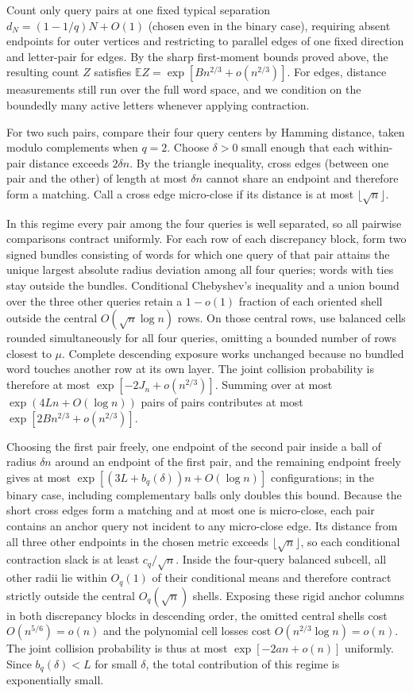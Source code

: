 Count only query pairs at one fixed typical separation $d_N=(1-1/q)N+O(1)$ (chosen even in the binary case), requiring absent endpoints for outer vertices and restricting to parallel edges of one fixed direction and letter-pair for edges. By the sharp first-moment bounds proved above, the resulting count $Z$ satisfies $\mathbb EZ=\exp[Bn^{2/3}+o(n^{2/3})]$. For edges, distance measurements still run over the full word space, and we condition on the boundedly many active letters whenever applying contraction.

For two such pairs, compare their four query centers by Hamming distance, taken modulo complements when $q=2$. Choose $\delta>0$ small enough that each within-pair distance exceeds $2\delta n$. By the triangle inequality, cross edges (between one pair and the other) of length at most $\delta n$ cannot share an endpoint and therefore form a matching. Call a cross edge micro-close if its distance is at most $\lfloor\sqrt n\rfloor$.

In this regime every pair among the four queries is well separated, so all pairwise comparisons contract uniformly. For each row of each discrepancy block, form two signed bundles consisting of words for which one query of that pair attains the unique largest absolute radius deviation among all four queries; words with ties stay outside the bundles. Conditional Chebyshev's inequality and a union bound over the three other queries retain a $1-o(1)$ fraction of each oriented shell outside the central $O(\sqrt n\log n)$ rows. On those central rows, use balanced cells rounded simultaneously for all four queries, omitting a bounded number of rows closest to $\mu$. Complete descending exposure works unchanged because no bundled word touches another row at its own layer. The joint collision probability is therefore at most $\exp[-2J_n+o(n^{2/3})]$. Summing over at most $\exp(4Ln+O(\log n))$ pairs of pairs contributes at most $\exp[2Bn^{2/3}+o(n^{2/3})]$.

Choosing the first pair freely, one endpoint of the second pair inside a ball of radius $\delta n$ around an endpoint of the first pair, and the remaining endpoint freely gives at most $\exp[(3L+b_q(\delta))n+O(\log n)]$ configurations; in the binary case, including complementary balls only doubles this bound. Because the short cross edges form a matching and at most one is micro-close, each pair contains an anchor query not incident to any micro-close edge. Its distance from all three other endpoints in the chosen metric exceeds $\lfloor\sqrt n\rfloor$, so each conditional contraction slack is at least $c_q/\sqrt n$. Inside the four-query balanced subcell, all other radii lie within $O_q(1)$ of their conditional means and therefore contract strictly outside the central $O_q(\sqrt n)$ shells. Exposing these rigid anchor columns in both discrepancy blocks in descending order, the omitted central shells cost $O(n^{5/6})=o(n)$ and the polynomial cell losses cost $O(n^{2/3}\log n)=o(n)$. The joint collision probability is thus at most $\exp[-2an+o(n)]$ uniformly. Since $b_q(\delta)<L$ for small $\delta$, the total contribution of this regime is exponentially small.

